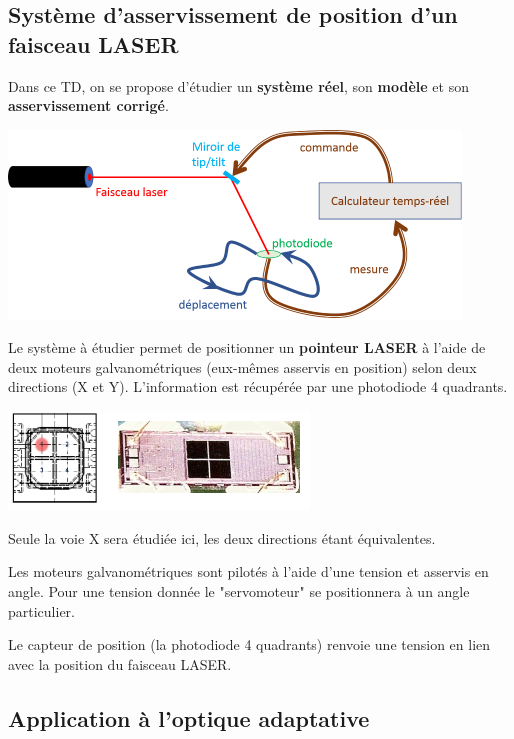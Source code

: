 \enteteThematiqueObligatoire{}

\subsection*{Système d'asservissement de position d'un faisceau LASER}

Dans ce TD, on se propose d'étudier un \textbf{système réel}, son \textbf{modèle} et son \textbf{asservissement corrigé}.

\begin{center}
	\includegraphics[width=12cm]{images/TD/systBoucle.png}
\end{center}


Le système à étudier permet de positionner un \textbf{pointeur LASER} à l'aide de deux moteurs galvanométriques (eux-mêmes asservis en position) selon deux directions (X et Y). L'information est récupérée par une photodiode 4 quadrants.

\begin{center}
	\includegraphics[width=8cm]{images/TD/4q_photodiode.png}
\end{center}

Seule la voie X sera étudiée ici, les deux directions étant équivalentes.

Les moteurs galvanométriques sont pilotés à l'aide d'une tension et asservis en angle. Pour une tension donnée le "servomoteur" se positionnera à un angle particulier.

Le capteur de position (la photodiode 4 quadrants) renvoie une tension en lien avec la position du faisceau LASER.

\subsection*{Application à l'optique adaptative}

